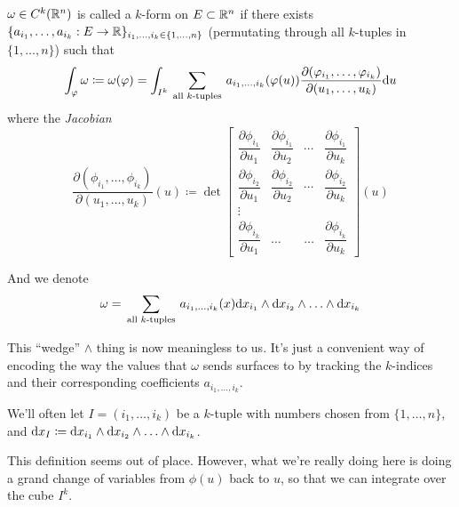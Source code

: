 \documentclass[a4paper, 11pt]{article}
\begin{document}
\begin{definition} [$k$-forms]
    $\omega \in C^k(\mathbb{R}^n)$ is called a $k$-form on $E \subset \mathbb{R}^n$ if there exists $\{a_{i_1}, \ldots, a_{i_k} : E \to \mathbb{R}\}_{i_1, \ldots, i_k \in \{1, \ldots, n\}}$ (permutating through all $k$-tuples in $\{1, \ldots, n\}$) such that
    \begin{equation*}
    \int_\varphi \omega \coloneqq \omega(\varphi) = \int_{I^k} \sum_{\:\text{all $k$-tuples}\: } a_{i_1, \ldots, i_k} (\varphi(u)) \frac{\partial (\varphi_{i_1}, \ldots, \varphi_{i_k})}{\partial (u_1, \ldots, u_k)} \mathrm{d} u 
    \end{equation*}
    where the \textit{Jacobian}
    \begin{equation*}
        \dfrac{\partial (\phi_{i_1}, \ldots, \phi_{i_k})}{\partial (u_1, \ldots, u_k)} (u) \coloneqq \det \begin{bmatrix}
            \dfrac{\partial \phi_{i_1}}{\partial u_1} &  \dfrac{\partial \phi_{i_1}}{\partial u_2} & \cdots & \dfrac{\partial \phi_{i_1}}{\partial u_k} \\
            \dfrac{\partial \phi_{i_2}}{\partial u_1} &  \dfrac{\partial \phi_{i_2}}{\partial u_2} & \cdots & \dfrac{\partial \phi_{i_2}}{\partial u_k} \\
            \vdots \\
            \dfrac{\partial \phi_{i_k}}{\partial u_1} & \ldots & \ldots & \dfrac{\partial \phi_{i_k}}{\partial u_k}
        \end{bmatrix} (u)
    \end{equation*}

    And we denote \begin{equation*}
    \omega = \sum_{\:\text{all $k$-tuples}\:} a_{i_1, \ldots, i_k}(x) \mathrm{d} x_{i_1} \wedge \mathrm{d} x_{i_2} \wedge \ldots \wedge \mathrm{d} x_{i_k}
    \end{equation*}

    This ``wedge'' $\wedge$ thing is now meaningless to us. It's just a convenient way of encoding the way the values that $\omega$ sends surfaces to by tracking the $k$-indices and their corresponding coefficients $a_{i_1, \ldots, i_k}$.
\end{definition}    

We'll often let $I = (i_1, \ldots, i_k)$ be a $k$-tuple with numbers chosen from $\{1, \ldots, n\}$, and $\mathrm{d} x_I \coloneqq \mathrm{d} x_{i_1} \wedge \mathrm{d} x_{i_2} \wedge \ldots \wedge \mathrm{d} x_{i_k}$.

\begin{remark}
This definition seems out of place. However, what we're really doing here is doing a grand change of variables from $\phi(u)$ back to $u$, so that we can integrate over the cube $I^k$.
\end{remark}
\end{document}
